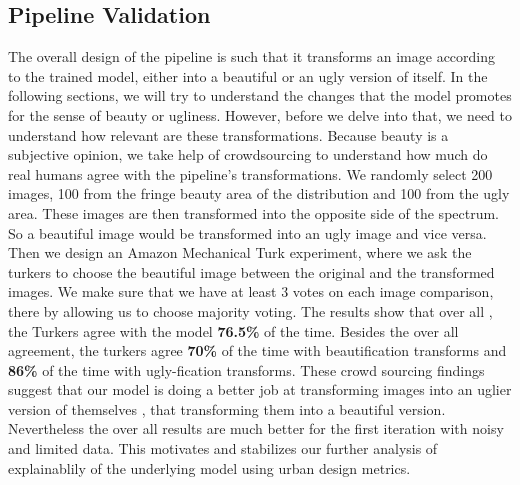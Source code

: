 \subsection{Pipeline Validation}
The overall design of the pipeline is such that it transforms an image according to the trained model, either into a beautiful or an ugly version of itself. In the following sections, we will try to understand the changes 
that the model promotes for the sense of beauty or ugliness. However, before we delve into that, we need to understand how relevant are these transformations. Because beauty is a subjective opinion, 
we take help of crowdsourcing to understand how much do real humans agree with the pipeline's transformations.
We randomly select 200 images, 100 from the fringe beauty area of the distribution and 100 from the ugly area. These images are then transformed into the opposite side of the spectrum. So a beautiful image would be transformed into an ugly image and vice versa. Then we design an Amazon Mechanical Turk experiment, where we ask the turkers to choose the beautiful image between the original and the transformed images. We make sure that we have at least 3 votes on each image comparison, there by allowing us to choose majority voting. The results show that over all , the Turkers agree with the model \textbf{76.5\%} of the time. Besides the over all agreement, the turkers agree \textbf{70\%} of the time with beautification transforms and \textbf{86\%} of the time with ugly-fication transforms.
These crowd sourcing findings suggest that our model is doing a better job at transforming images into an uglier version of themselves , that transforming them into a beautiful version. Nevertheless the over all results are much better for the first iteration with noisy and limited data. This motivates and stabilizes our further analysis of explainablily of the underlying model using urban design metrics.